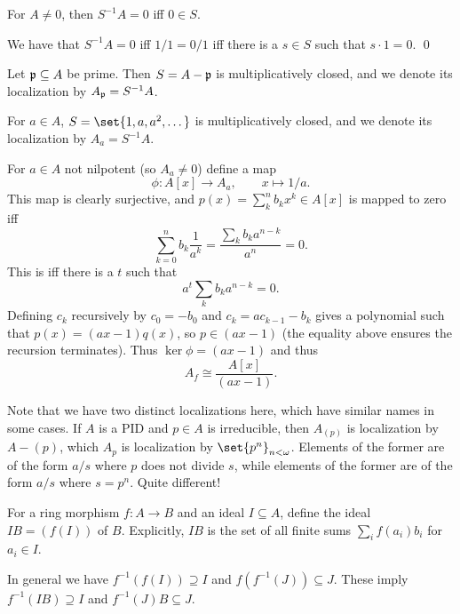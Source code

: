 \eexam

\bprop

    For $A\neq0$, then $S^{-1}A=0$ iff $0\in S$.

\eprop

\bproof

    We have that $S^{-1}A=0$ iff $1/1=0/1$ iff there is a $s\in S$ such that $s\cdot1=0$.
    \qed

\eproof

\bdefn

    Let ${{\frak p}}\subseteq A$ be prime.
    Then $S=A-{{\frak p}}$ is multiplicatively closed, and we denote its localization by $A_{{\frak p}}=S^{-1}A$.

    For $a\in A$, $S=\set{1,a,a^2,\dots}$ is multiplicatively closed, and we denote its localization by $A_a=S^{-1}A$.

\edefn

For $a\in A$ not nilpotent (so $A_a\neq0$) define a map
$$ \phi\colon A[x] \to A_a,\qquad x\mapsto 1/a . $$
This map is clearly surjective, and $p(x)=\sum_k^nb_kx^k\in A[x]$ is mapped to zero iff
$$ \sum_{k=0}^nb_k\frac1{a^k} = \frac{\sum_kb_ka^{n-k}}{a^n} = 0 . $$
This is iff there is a $t$ such that
$$ a^t\sum_kb_ka^{n-k} = 0 . $$
Defining $c_k$ recursively by $c_0=-b_0$ and $c_k=ac_{k-1}-b_k$ gives a polynomial such that $p(x)=(ax-1)q(x)$, so $p\in(ax-1)$
(the equality above ensures the recursion terminates).
Thus $\ker\phi=(ax-1)$ and thus
$$ A_f \cong \frac{A[x]}{(ax-1)} . $$

\bnote

    Note that we have two distinct localizations here, which have similar names in some cases.
    If $A$ is a PID and $p\in A$ is irreducible, then $A_{(p)}$ is localization by $A-(p)$, which $A_p$ is localization by $\set{p^n}_{n<\omega}$.
    Elements of the former are of the form $a/s$ where $p$ does not divide $s$, while elements of the former are of the form $a/s$ where $s=p^n$.
    Quite different!

\enote

\bdefn

    For a ring morphism $f\colon A\to B$ and an ideal $I\subseteq A$, define the ideal $IB=(f(I))$ of $B$.
    Explicitly, $IB$ is the set of all finite sums $\sum_if(a_i)b_i$ for $a_i\in I$.

\edefn

In general we have $f^{-1}(f(I))\supseteq I$ and $f(f^{-1}(J))\subseteq J$.
These imply $f^{-1}(IB)\supseteq I$ and $f^{-1}(J)B\subseteq J$.

\bdefn

